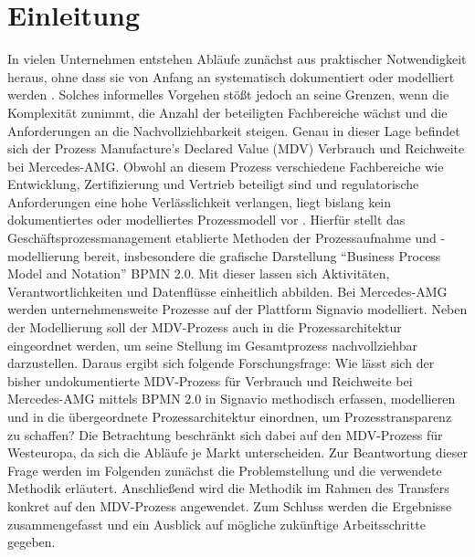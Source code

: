 \chapter{Einleitung}
In vielen Unternehmen entstehen Abläufe zunächst aus praktischer Notwendigkeit heraus, ohne dass sie von Anfang an systematisch dokumentiert oder modelliert werden \cite{Pospiech2014}. Solches informelles Vorgehen stößt jedoch an seine Grenzen, wenn die Komplexität zunimmt, die Anzahl der beteiligten Fachbereiche wächst und die Anforderungen an die Nachvollziehbarkeit steigen. Genau in dieser Lage befindet sich der Prozess Manufacture's Declared Value (\acs{MDV}) Verbrauch und Reichweite bei Mercedes-AMG. Obwohl an diesem Prozess verschiedene Fachbereiche wie Entwicklung, Zertifizierung und Vertrieb beteiligt sind und regulatorische Anforderungen eine hohe Verlässlichkeit verlangen, liegt bislang kein dokumentiertes oder modelliertes Prozessmodell vor . Hierfür stellt das Geschäftsprozessmanagement etablierte Methoden der Prozessaufnahme und -modellierung bereit, insbesondere die grafische Darstellung ``Business Process Model and Notation'' \acs{BPMN} 2.0. Mit dieser lassen sich Aktivitäten, Verantwortlichkeiten und Datenflüsse einheitlich abbilden. Bei Mercedes-AMG werden unternehmensweite Prozesse auf der Plattform Signavio modelliert. Neben der Modellierung soll der MDV-Prozess auch in die Prozessarchitektur eingeordnet werden, um seine Stellung im Gesamtprozess nachvollziehbar darzustellen. Daraus ergibt sich folgende Forschungsfrage: Wie lässt sich der bisher undokumentierte MDV-Prozess für Verbrauch und Reichweite bei Mercedes-AMG mittels BPMN 2.0 in Signavio methodisch erfassen, modellieren und in die übergeordnete Prozessarchitektur einordnen, um Prozesstransparenz zu schaffen? Die Betrachtung beschränkt sich dabei auf den MDV-Prozess für Westeuropa, da sich die Abläufe je Markt unterscheiden. Zur Beantwortung dieser Frage werden im Folgenden zunächst die Problemstellung und die verwendete Methodik erläutert. Anschließend wird die Methodik im Rahmen des Transfers konkret auf den MDV-Prozess angewendet. Zum Schluss werden die Ergebnisse zusammengefasst und ein Ausblick auf mögliche zukünftige Arbeitsschritte gegeben.
